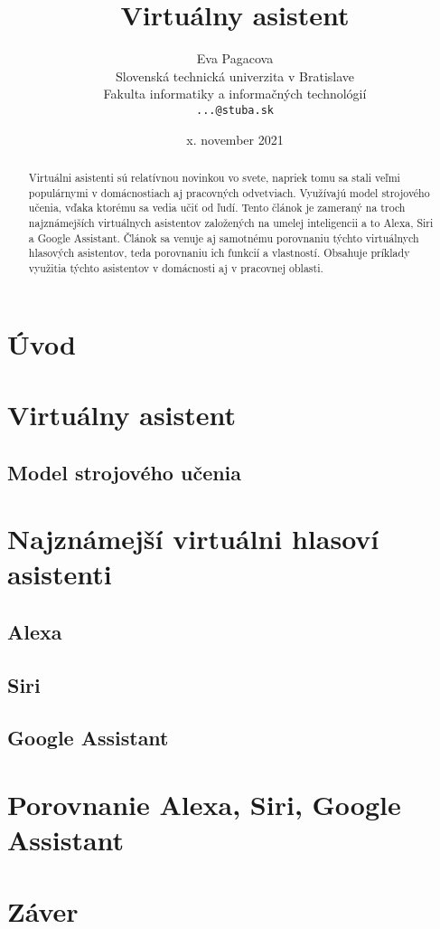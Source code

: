 \documentclass[10pt,twoside,slovak,coursepaper]{article}
\title{Virtuálny asistent}
\author{Eva Pagacova\\[2pt]
	{\small Slovenská technická univerzita v Bratislave}\\
	{\small Fakulta informatiky a informačných technológií}\\
	{\small \texttt{...@stuba.sk}}
	}
\date{\small x. november 2021}
\begin{document}
\maketitle

\begin{abstract}
 Virtuálni asistenti sú relatívnou novinkou vo svete, napriek tomu sa stali veľmi populárnymi v domácnostiach aj pracovných odvetviach. Využívajú model strojového učenia, vďaka ktorému sa vedia učiť od ľudí. Tento článok je zameraný na troch najznámejších virtuálnych asistentov založených na umelej inteligencii a to Alexa, Siri a Google Assistant. Článok sa venuje aj samotnému porovnaniu týchto virtuálnych hlasových asistentov, teda porovnaniu ich funkcií a vlastností. Obsahuje príklady využitia týchto asistentov v domácnosti aj v pracovnej oblasti.
\end{abstract}

\section{Úvod} \label{uvod}
\section{Virtuálny asistent}
\subsection{Model strojového učenia}
\section{Najznámejší virtuálni hlasoví asistenti}
\subsection{Alexa}
\subsection{Siri}
\subsection{Google Assistant}
\section{Porovnanie Alexa, Siri, Google Assistant}
\section{Záver}




\end{document}

